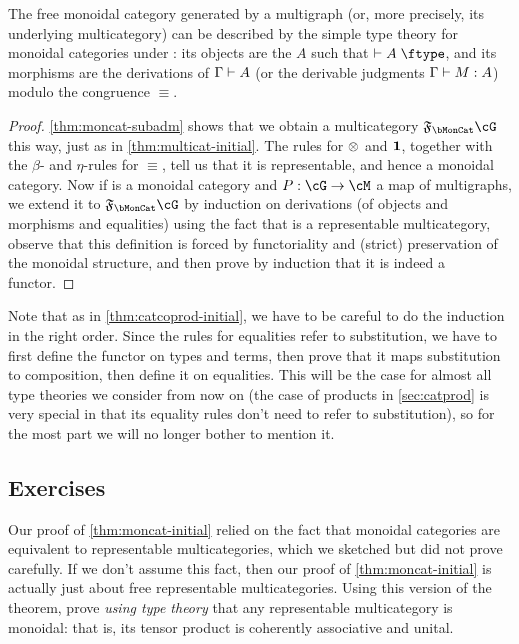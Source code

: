 \begin{thm}\label{thm:moncat-initial}
  The free monoidal category generated by a multigraph \cG (or, more precisely, its underlying multicategory) can be described by the simple type theory for monoidal categories under \cG: its objects are the $A$ such that $\types A\type$, and its morphisms are the derivations of $\Gamma\vdash A$ (or the derivable judgments $\Gamma\vdash M:A$) modulo the congruence $\equiv$.
\end{thm}
\begin{proof}
  \cref{thm:moncat-subadm} shows that we obtain a multicategory $\F\bMonCat\cG$ this way, just as in \cref{thm:multicat-initial}.
  The rules for $\otimes$ and $\mathbf{1}$, together with the $\beta$- and $\eta$-rules for $\equiv$, tell us that it is representable, and hence a monoidal category.
  Now if \cM is a monoidal category and $P:\cG\to\cM$ a map of multigraphs, we extend it to $\F\bMonCat\cG$ by induction on derivations (of objects and morphisms and equalities) using the fact that \cM is a representable multicategory, observe that this definition is forced by functoriality and (strict) preservation of the monoidal structure, and then prove by induction that it is indeed a functor.
\end{proof}

Note that as in \cref{thm:catcoprod-initial}, we have to be careful to do the induction in the right order.
Since the rules for equalities refer to substitution, we have to first define the functor on types and terms, then prove that it maps substitution to composition, then define it on equalities.
This will be the case for almost all type theories we consider from now on (the case of products in \cref{sec:catprod} is very special in that its equality rules don't need to refer to substitution), so for the most part we will no longer bother to mention it.


\subsection*{Exercises}

\begin{ex}\label{ex:repmulticat-moncat}
  Our proof of \cref{thm:moncat-initial} relied on the fact that monoidal categories are equivalent to representable multicategories, which we sketched but did not prove carefully.
  If we don't assume this fact, then our proof of \cref{thm:moncat-initial} is actually just about free representable multicategories.
  Using this version of the theorem, prove \emph{using type theory} that any representable multicategory is monoidal: that is, its tensor product is coherently associative and unital.
\end{ex}

